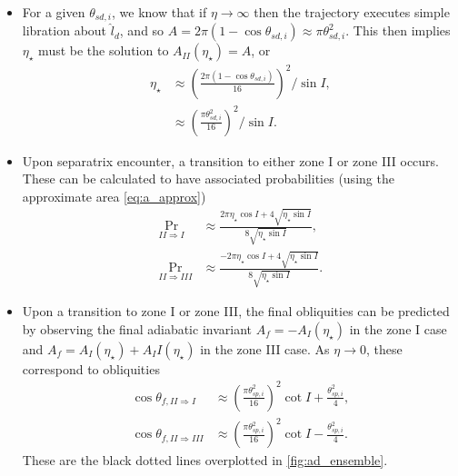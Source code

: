 \documentclass[
        fleqn,
        usenatbib,
    ]{mnras}
\newcommand*{\p}[1]{\left(#1\right)}
\begin{document}
\begin{itemize}
    \item For a given $\theta_{sd, i}$, we know that if $\eta \to \infty$ then
        the trajectory executes simple libration about $\hat{l}_d$, and so $A =
        2\pi\p{1 - \cos \theta_{sd, i}} \approx \pi \theta_{sd, i}^2$. This
        then implies $\eta_\star$ must be the solution to $A_{II}(\eta_\star) =
        A$, or
        \begin{align}
            \eta_\star &\approx \p{\frac{2\pi\p{1 - \cos \theta_{sd,i}}}{
                        16}}^2 / \sin I,\nonumber\\
                    &\approx \p{\frac{\pi \theta_{sd, i}^2}{16}}^2/\sin I.
        \end{align}

    \item Upon separatrix encounter, a transition to either zone I or zone III
        occurs. These can be calculated to have associated probabilities (using
        the approximate area \autoref{eq:a_approx})
        \begin{align}
            \Pr_{II \Rightarrow I} &\approx \frac{2\pi
                \eta_{\star} \cos I + 4\sqrt{\eta_{\star}\sin
                I}}{8\sqrt{\eta_{\star}\sin I}},\\
            \Pr_{II \Rightarrow III} &\approx \frac{-2\pi
                \eta_{\star} \cos I + 4\sqrt{\eta_{\star}\sin
                I}}{8\sqrt{\eta_{\star}\sin I}}.
        \end{align}

    \item Upon a transition to zone I or zone III, the final obliquities can be
        predicted by observing the final adiabatic invariant $A_f =
        -A_I(\eta_\star)$ in the zone I case and $A_f = A_I(\eta_\star) +
        A_II(\eta_\star)$ in the zone III case. As $\eta \to 0$, these
        correspond to obliquities
        \begin{align}
            \cos \theta_{f, II \Rightarrow I} &\approx
                \p{\frac{\pi \theta_{sp, i}^2}{16}}^2 \cot I
                    + \frac{\theta_{sp, i}^2}{4},\\
            \cos \theta_{f, II \Rightarrow III} &\approx
                \p{\frac{\pi \theta_{sp, i}^2}{16}}^2 \cot I
                    - \frac{\theta_{sp, i}^2}{4}.
        \end{align}
        These are the black dotted lines overplotted in
        \autoref{fig:ad_ensemble}.
\end{itemize}
\end{document}
